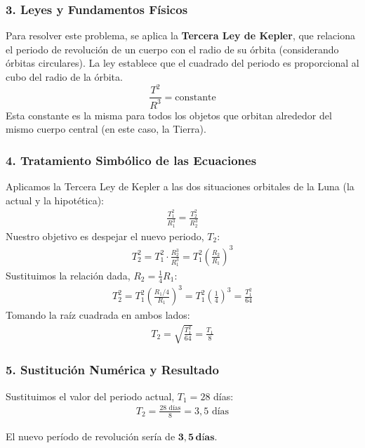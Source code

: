 \subsubsection*{3. Leyes y Fundamentos Físicos}
Para resolver este problema, se aplica la \textbf{Tercera Ley de Kepler}, que relaciona el periodo de revolución de un cuerpo con el radio de su órbita (considerando órbitas circulares). La ley establece que el cuadrado del periodo es proporcional al cubo del radio de la órbita.
$$ \frac{T^2}{R^3} = \text{constante} $$
Esta constante es la misma para todos los objetos que orbitan alrededor del mismo cuerpo central (en este caso, la Tierra).

\subsubsection*{4. Tratamiento Simbólico de las Ecuaciones}
Aplicamos la Tercera Ley de Kepler a las dos situaciones orbitales de la Luna (la actual y la hipotética):
\begin{gather}
    \frac{T_1^2}{R_1^3} = \frac{T_2^2}{R_2^3}
\end{gather}
Nuestro objetivo es despejar el nuevo periodo, $T_2$:
\begin{gather}
    T_2^2 = T_1^2 \cdot \frac{R_2^3}{R_1^3} = T_1^2 \left(\frac{R_2}{R_1}\right)^3
\end{gather}
Sustituimos la relación dada, $R_2 = \frac{1}{4} R_1$:
\begin{gather}
    T_2^2 = T_1^2 \left(\frac{R_1/4}{R_1}\right)^3 = T_1^2 \left(\frac{1}{4}\right)^3 = \frac{T_1^2}{64}
\end{gather}
Tomando la raíz cuadrada en ambos lados:
\begin{gather}
    T_2 = \sqrt{\frac{T_1^2}{64}} = \frac{T_1}{8}
\end{gather}

\subsubsection*{5. Sustitución Numérica y Resultado}
Sustituimos el valor del periodo actual, $T_1 = 28$ días:
\begin{gather}
    T_2 = \frac{28 \text{ días}}{8} = 3,5 \text{ días}
\end{gather}
\begin{cajaresultado}
    El nuevo período de revolución sería de $\boldsymbol{3,5 \, \textbf{días}}$.
\end{cajaresultado}

